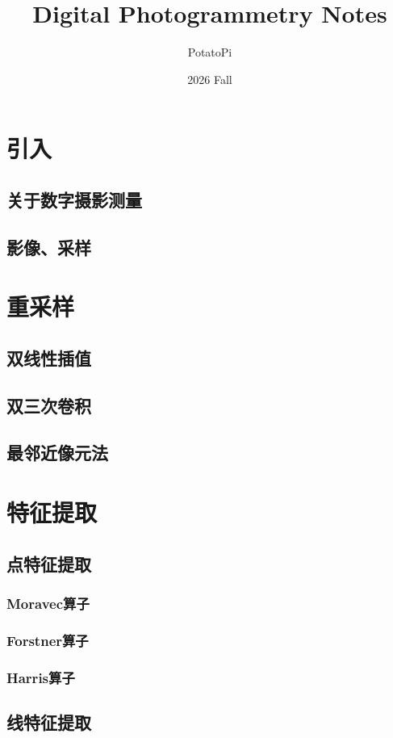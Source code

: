 \documentclass[12pt,a4paper]{article}
\title{Digital Photogrammetry Notes}
\author{PotatoPi}
\date{2026 Fall}
\begin{document}
\maketitle

\section{引入}
\subsection{关于数字摄影测量}
\subsection{影像、采样}

\section{重采样}
\subsection{双线性插值}
\subsection{双三次卷积}
\subsection{最邻近像元法}

\section{特征提取}
\subsection{点特征提取}
\subsubsection{Moravec算子}
\subsubsection{Forstner算子}
\subsubsection{Harris算子}

\subsection{线特征提取}
\end{document}
